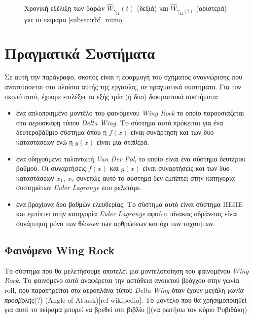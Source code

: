 \begin{figure}
	\begin{subfigure}{0.5\textwidth}
		
	\end{subfigure}
	\begin{subfigure}{0.5\textwidth}
		
	\end{subfigure}
	\caption{ Χρονική εξέλιξη των βαρών $\hat{W}_{\gamma_{21}}(t)$ (δεξιά) και $\hat{W}_{\gamma_{22}(t)}$ (αριστερά) για το πείραμα \ref{subsec:rbf_mimo}}
	\label{fig:mimo_gamma2_weights}
	\end{figure}

\pagebreak

\section{Πραγματικά Συστήματα}
Σε αυτή την παράγραφο, σκοπός είναι η εφαρμογή του σχήματος αναγνώρισης που αναπτύσσεται στα πλαίσια αυτής της εργασίας, σε πραγματικά συστήματα. Για τον σκοπό αυτό, έχουμε επιλέξει τα εξής τρία (ή δυο) δοκιμαστικά συστήματα:
\begin{itemize}
	\item ένα απλοποιημένο μοντέλο του φαινόμενου \textit{Wing Rock} το οποίο παρουσιάζεται στα αεροσκάφη τύπου \textit{Delta Wing}. Το σύστημα αυτό πρόκειται για ένα δευτεροβάθμιο σύστημα όπου η $f(x)$ είναι συνάρτηση και των δυο καταστάσεων ενώ η $g(x)$ είναι μια σταθερά.
	
	\item ένα οδηγούμενο ταλαντωτή \textit{Van Der Pol}, το οποίο είναι ένα σύστημα δευτέρου βαθμού. Οι συναρτήσεις $f(x)$ και $g(x)$ είναι συναρτήσεις και των δυο καταστάσεων $x_1$, $x_2$ συνεπώς αυτό το σύστημα δεν εμπίπτει στην κατηγορία συστημάτων \textit{Euler Lagrange} που μελετάμε.
	
	\item ένα βραχίονα δυο βαθμών ελευθερίας. Το σύστημα αυτό είναι σύστημα ΠΕΠΕ και εμπίπτει στην κατηγορία \textit{Euler Lagrange} αφού ο πίνακας αδράνειας είναι συνάρτηση μόνο των θέσεων των αρθρώσεων και όχι των ταχυτήτων.
\end{itemize}


\subsection{Φαινόμενο Wing Rock}
Το σύστημα που θα μελετήσουμε αποτελεί μια μοντελοποίηση του φαινομένου \textit{Wing Rock}. Το φαινόμενο αυτό αναφέρεται την αστάθεια ανοικτού βρόγχου στην γωνία roll, που παρατηρείται στα αεροπλάνα τύπου \textit{Delta Wing} όταν έχουν μεγάλη \textit{γωνία προσβολής}(?) (Angle of Attack)[ref wikipedia]. Το μοντέλο που θα χρησιμοποιηθεί για αυτό το πείραμα μπορεί να βρεθεί στο βιβλίο [](να ρωτήσω τον κύριο Ροβιθάκη)

